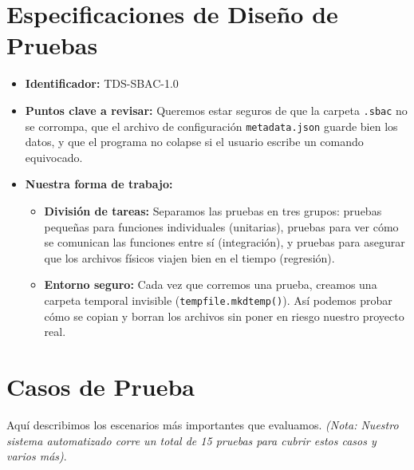 \documentclass[12pt, letterpaper]{article}
\begin{document}
\section{Especificaciones de Diseño de Pruebas}
\begin{itemize}[leftmargin=*]
    \item \textbf{Identificador:} TDS-SBAC-1.0
    \item \textbf{Puntos clave a revisar:} Queremos estar seguros de que la carpeta \texttt{.sbac} no se corrompa, que el archivo de configuración \texttt{metadata.json} guarde bien los datos, y que el programa no colapse si el usuario escribe un comando equivocado.
    \item \textbf{Nuestra forma de trabajo:}
    \begin{itemize}
        \item \textbf{División de tareas:} Separamos las pruebas en tres grupos: pruebas pequeñas para funciones individuales (unitarias), pruebas para ver cómo se comunican las funciones entre sí (integración), y pruebas para asegurar que los archivos físicos viajen bien en el tiempo (regresión).
        \item \textbf{Entorno seguro:} Cada vez que corremos una prueba, creamos una carpeta temporal invisible (\texttt{tempfile.mkdtemp()}). Así podemos probar cómo se copian y borran los archivos sin poner en riesgo nuestro proyecto real.
    \end{itemize}
\end{itemize}

\section{Casos de Prueba}
Aquí describimos los escenarios más importantes que evaluamos. \textit{(Nota: Nuestro sistema automatizado corre un total de 15 pruebas para cubrir estos casos y varios más)}.
\end{document}

